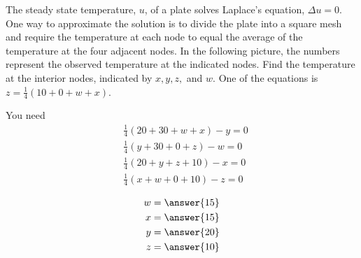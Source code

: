 \documentclass{ximera}
\begin{document}
\begin{problem}\label{prb:2.43} The steady state temperature, $u$, of a plate solves Laplace's
equation, $\Delta u=0.$ One way to approximate the solution is to divide the plate into a square mesh and require the temperature
at each node to equal the average of the temperature at the four adjacent
nodes. In the following picture, the numbers represent the observed
temperature at the indicated nodes. Find the temperature at
the interior nodes, indicated by $x,y,z,$ and $w$. One of the equations is
$z=\frac{1}{4}\left( 10+0+w+x\right) $.

\begin{center}
\end{center}

\begin{hint}
You need 
\begin{align*}
&\frac{1}{4}\left( 20+30+w+x\right) -y=0 \\
&\frac{1}{4}\left( y+30+0+z\right) -w=0 \\
&\frac{1}{4}\left( 20+y+z+10\right) -x=0 \\
&\frac{1}{4}\left( x+w+0+10\right) -z=0
\end{align*}
\end{hint}
 \begin{align*}
 w&=\answer{15}\\
 x&=\answer{15}\\
 y&=\answer{20}\\
 z&=\answer{10}\\
 \end{align*}
\end{problem}
\end{document}
